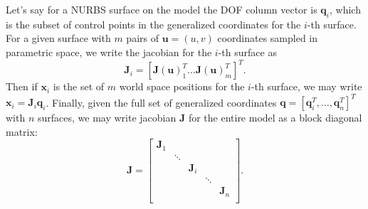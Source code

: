 Let's say for a NURBS surface on the model the DOF column vector is $\mathbf{q}_i$, which is the subset of control points in the generalized coordinates for the $i$-th surface. For a given surface with $m$ pairs of $\mathbf{u}=(u,v)$ coordinates sampled in parametric space, we write the jacobian for the $i$-th surface as 
\begin{equation}
\label{eqn:surface_jacobian}
    \mathbf{J}_i =
    \left[ \mathbf{J}(\mathbf{u})_1^T \dots \mathbf{J}(\mathbf{u})_m^T \right]^T
    \text{.}
\end{equation}
Then if $\mathbf{x}_i$ is the set of $m$ world space positions for the $i$-th surface, we may write $\mathbf{x}_i = \mathbf{J}_i \mathbf{q}_i$. Finally, given the full set of generalized coordinates $\mathbf{q} = \left[ \mathbf{q}_i^T, \dots, \mathbf{q}_n^T \right]^T$ with $n$ surfaces, we may write jacobian $\mathbf{J}$ for the entire model as a block diagonal matrix:
\begin{equation}
\mathbf{J} = \left[ \begin{array}{ccccc}
\mathbf{J}_1 &  &  &  &  \\
 & \ddots &  &  &  \\
 &  & \mathbf{J}_i & &  \\
 &  &  & \ddots &  \\
 &  &  &  & \mathbf{J}_n \\
\end{array} \right]
\text{.}
\end{equation}



